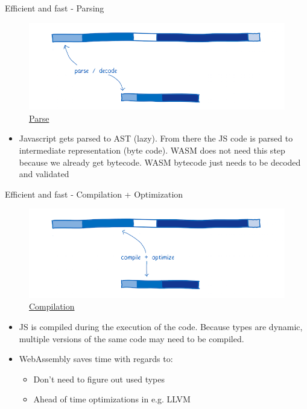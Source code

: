 \documentclass{beamer}
\begin{document}
\begin{frame}{Efficient and fast - Parsing}
    \begin{figure}
        \includegraphics[scale=0.2]{./images/pasedecode.png}
        \caption{\href{https://www.smashingmagazine.com/2017/05/abridged-cartoon-introduction-webassembly/}{Parse}}
    \end{figure}
    \begin{itemize}
        \item Javascript gets parsed to AST (lazy). From there the JS code is parsed to intermediate representation (byte code). WASM does not need this step because we already get bytecode. WASM bytecode just needs to be decoded and validated
    \end{itemize}
\end{frame}

\begin{frame}{Efficient and fast - Compilation + Optimization}
    \begin{figure}
        \includegraphics[scale=0.2]{./images/copyoptimize.png}
        \caption{\href{https://www.smashingmagazine.com/2017/05/abridged-cartoon-introduction-webassembly/}{Compilation}}
    \end{figure}
    \begin{itemize}
        \item JS is compiled during the execution of the code. Because types are dynamic, multiple versions of the same code may need to be compiled.
        \item WebAssembly saves time with regards to:
              \begin{itemize}
                  \item Don't need to figure out used types
                  \item Ahead of time optimizations in e.g. LLVM
              \end{itemize}
    \end{itemize}
\end{frame}
\end{document}
